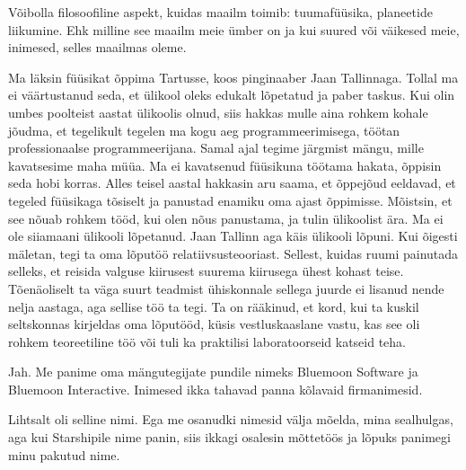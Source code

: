 
Võibolla filosoofiline aspekt, kuidas 
maailm toimib: tuumafüüsika, planeetide liikumine. Ehk milline see maailm meie 
ümber on ja kui suured või väikesed meie, inimesed, selles maailmas oleme. 


Ma läksin füüsikat õppima Tartusse, koos pinginaaber Jaan 
Tallinnaga. Tollal ma ei väärtustanud seda, 
et ülikool oleks   
edukalt lõpetatud ja paber taskus. Kui olin umbes poolteist aastat ülikoolis 
olnud, siis hakkas mulle aina rohkem kohale jõudma, et tegelikult tegelen ma 
kogu aeg programmeerimisega, töötan professionaalse programmeerijana. 
Samal ajal tegime järgmist mängu, mille kavatsesime maha müüa. Ma ei kavatsenud 
füüsikuna töötama hakata, õppisin seda hobi 
korras. Alles teisel aastal hakkasin aru saama, et õppejõud eeldavad, 
et tegeled füüsikaga tõsiselt ja panustad enamiku oma ajast õppimisse. 
Mõistsin, et see nõuab rohkem 
tööd, kui olen nõus panustama, ja tulin ülikoolist ära. Ma ei ole siiamaani 
ülikooli lõpetanud. Jaan Tallinn aga käis ülikooli 
lõpuni. Kui õigesti mäletan, tegi ta oma lõputöö 
relatiivsusteooriast. Sellest, kuidas ruumi painutada selleks, et reisida 
valguse kiirusest suurema kiirusega ühest kohast teise. 
Tõenäoliselt ta väga suurt teadmist ühiskonnale sellega juurde 
ei lisanud nende nelja aastaga, aga sellise töö ta tegi. Ta 
on rääkinud, et kord, kui ta kuskil seltskonnas kirjeldas oma lõputööd, 
küsis vestluskaaslane vastu, kas see oli 
rohkem teoreetiline töö või tuli ka praktilisi laboratoorseid katseid teha.

\label{sisu!bluemoon}

Jah. Me panime oma mängutegijate pundile nimeks Bluemoon 
Software ja Bluemoon Interactive. Inimesed ikka tahavad panna 
kõlavaid firmanimesid.


Lihtsalt oli selline nimi. Ega me osanudki nimesid välja mõelda, mina 
sealhulgas, aga kui Starshipile nime panin, siis ikkagi osalesin mõttetöös ja lõpuks panimegi 
minu pakutud nime.


